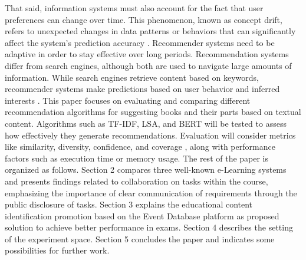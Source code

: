 \documentclass[conference]{IEEEtran}
\begin{document}
That said, information systems must also account for the fact that user preferences can change over time. This phenomenon, known as concept drift, refers to unexpected changes in data patterns or behaviors that can significantly affect the system’s prediction accuracy \cite{Sun2024}. Recommender systems need to be adaptive in order to stay effective over long periods.
Recommendation systems differ from search engines, although both are used to navigate large amounts of information. While search engines retrieve content based on keywords, recommender systems make predictions based on user behavior and inferred interests \cite{De_Nart201484}.
This paper focuses on evaluating and comparing different recommendation algorithms for suggesting books and their parts based on textual content. Algorithms such as TF-IDF, LSA, and BERT will be tested to assess how effectively they generate recommendations. Evaluation will consider metrics like similarity, diversity, confidence, and coverage \cite{Gunawardana2022547}, along with performance factors such as execution time or memory usage.
%
%
%
The rest of the paper is organized as follows. Section 2 compares three well-known e-Learning systems and presents findings related to collaboration on tasks within the course, emphasizing the importance of clear communication of requirements through the public disclosure of tasks. Section 3 explains the educational content identification promotion based on the Event Database platform as proposed solution to achieve better performance in exams. Section 4 describes the setting of the experiment space. Section 5 concludes the paper and indicates some possibilities for further work.
%
%
%
\end{document}

